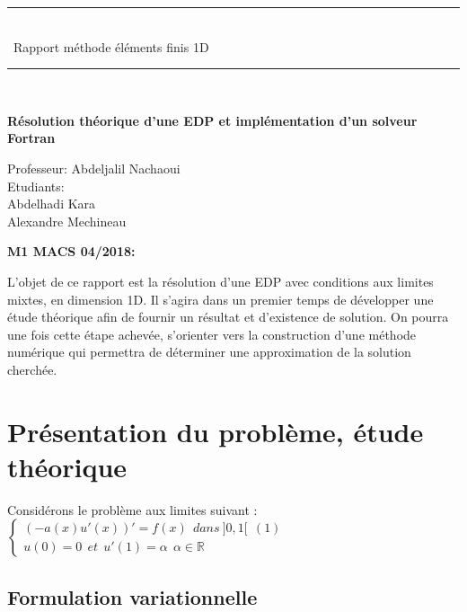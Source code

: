 \documentclass[a4paper,french,10pt]{article}
\begin{document}
\begin{titlepage}
	\centering
    
    \vspace{1cm}
	\rule{\linewidth}{0.2 mm} \\[0.4 cm]
	{ \huge\ Rapport méthode éléments finis 1D}\\
	\rule{\linewidth}{0.2 mm} \\[1.5 cm]

\vspace{-2cm}
\begin{center}
\end{center}
\begin{center}
\Large{\textbf{Résolution théorique d'une EDP et implémentation d'un solveur Fortran}}\\
\end{center}



\vspace{2cm}
Professeur: Abdeljalil Nachaoui\\
Etudiants:\\
Abdelhadi Kara\\
Alexandre Mechineau\\


\vspace{1 cm}

\textbf{\large{M1 MACS 04/2018:}}
\vspace{0.5cm}


\vspace{1 cm}
\vfill
	
\end{titlepage}

\newpage
\abstract{}
L'objet de ce rapport est la résolution d'une EDP avec conditions aux limites mixtes, en dimension 1D. Il s'agira dans un premier temps de développer une étude théorique afin de fournir un résultat et d’existence de solution. On pourra une fois cette étape achevée, s'orienter vers la construction d'une méthode numérique qui permettra de déterminer une approximation de la solution cherchée.
\newpage

\tableofcontents
\newpage\section{Présentation du problème, étude théorique}

Considérons le problème aux limites suivant :
\newline\newline  $\left\{
\begin{array}{l}
  (-a(x)u'(x))'=f(x)~~dans~]0,1[~~(1) \\
  u(0)=0~~ et~~u'(1)= \alpha~~\alpha \in \mathds{R}
\end{array}
\right.$
\newline\newline\subsection{Formulation variationnelle}
\end{document}
